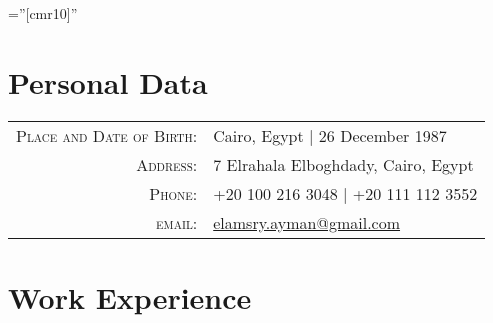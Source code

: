 \documentclass[a4paper,11pt]{article} %
\begin{document}
\pagestyle{empty} %

\font\fb=''[cmr10]'' %


\par{\bigskip\par} %

\section{Personal Data}

\begin{tabular}{rl}
\textsc{Place and Date of Birth:} & Cairo, Egypt | 26 December 1987 \\
\textsc{Address:} & 7 Elrahala Elboghdady, Cairo, Egypt \\
\textsc{Phone:} & +20 100 216 3048 | +20 111 112 3552 \\
\textsc{email:} & \href{mailto:elmasry.ayman@gmail.com}{elamsry.ayman@gmail.com}
\end{tabular}


\section{Work Experience}
\end{document}
